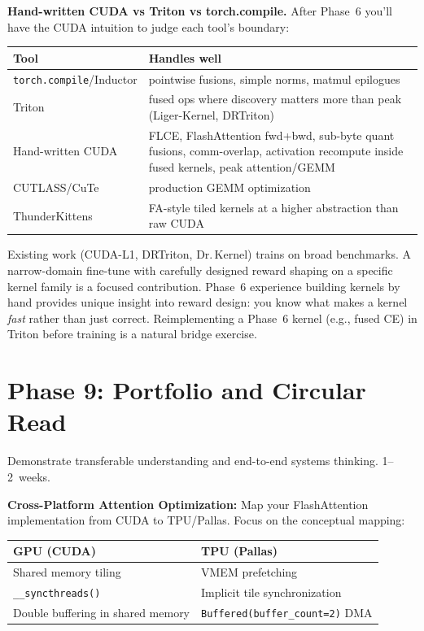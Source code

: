 \documentclass[11pt, letterpaper]{article}
\begin{document}
\textbf{Hand-written CUDA vs Triton vs torch.compile.} After Phase~6 you'll have the CUDA intuition to judge each tool's boundary:

\smallskip
\begin{tabularx}{\textwidth}{@{}lX@{}}
\toprule
\textbf{Tool} & \textbf{Handles well} \\
\midrule
\texttt{torch.compile}/Inductor & pointwise fusions, simple norms, matmul epilogues \\
Triton & fused ops where discovery matters more than peak (Liger-Kernel, DRTriton) \\
Hand-written CUDA & FLCE, FlashAttention fwd+bwd, sub-byte quant fusions, comm-overlap, activation recompute inside fused kernels, peak attention/GEMM \\
CUTLASS/CuTe & production GEMM optimization \\
ThunderKittens & FA-style tiled kernels at a higher abstraction than raw CUDA \\
\bottomrule
\end{tabularx}

\medskip
Existing work (CUDA-L1, DRTriton, Dr.\,Kernel) trains on broad benchmarks. A narrow-domain fine-tune with carefully designed reward shaping on a specific kernel family is a focused contribution. Phase~6 experience building kernels by hand provides unique insight into reward design: you know what makes a kernel \emph{fast} rather than just correct. Reimplementing a Phase~6 kernel (e.g., fused CE) in Triton before training is a natural bridge exercise.

\section{Phase 9: Portfolio and Circular Read}

\begin{phasebox}[Goal]
Demonstrate transferable understanding and end-to-end systems thinking. 1--2~weeks.
\end{phasebox}

\textbf{Cross-Platform Attention Optimization:} Map your FlashAttention implementation from CUDA to TPU/Pallas. Focus on the conceptual mapping:

\smallskip
\begin{tabularx}{\textwidth}{@{}lX@{}}
\toprule
\textbf{GPU (CUDA)} & \textbf{TPU (Pallas)} \\
\midrule
Shared memory tiling & VMEM prefetching \\
\texttt{\_\_syncthreads()} & Implicit tile synchronization \\
Double buffering in shared memory & \texttt{Buffered(buffer\_count=2)} DMA \\
\bottomrule
\end{tabularx}
\end{document}
